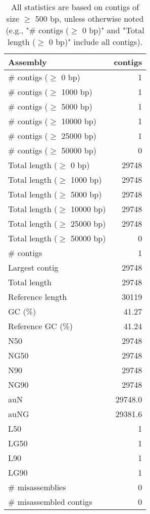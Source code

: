 \documentclass[12pt,a4paper]{article}
\begin{document}
\begin{table}[ht]
\begin{center}
\caption{All statistics are based on contigs of size $\geq$ 500 bp, unless otherwise noted (e.g., "\# contigs ($\geq$ 0 bp)" and "Total length ($\geq$ 0 bp)" include all contigs).}
\begin{tabular}{|l*{1}{|r}|}
\hline
Assembly & contigs \\ \hline
\# contigs ($\geq$ 0 bp) & 1 \\ \hline
\# contigs ($\geq$ 1000 bp) & 1 \\ \hline
\# contigs ($\geq$ 5000 bp) & 1 \\ \hline
\# contigs ($\geq$ 10000 bp) & 1 \\ \hline
\# contigs ($\geq$ 25000 bp) & 1 \\ \hline
\# contigs ($\geq$ 50000 bp) & 0 \\ \hline
Total length ($\geq$ 0 bp) & 29748 \\ \hline
Total length ($\geq$ 1000 bp) & 29748 \\ \hline
Total length ($\geq$ 5000 bp) & 29748 \\ \hline
Total length ($\geq$ 10000 bp) & 29748 \\ \hline
Total length ($\geq$ 25000 bp) & 29748 \\ \hline
Total length ($\geq$ 50000 bp) & 0 \\ \hline
\# contigs & 1 \\ \hline
Largest contig & 29748 \\ \hline
Total length & 29748 \\ \hline
Reference length & 30119 \\ \hline
GC (\%) & 41.27 \\ \hline
Reference GC (\%) & 41.24 \\ \hline
N50 & 29748 \\ \hline
NG50 & 29748 \\ \hline
N90 & 29748 \\ \hline
NG90 & 29748 \\ \hline
auN & 29748.0 \\ \hline
auNG & 29381.6 \\ \hline
L50 & 1 \\ \hline
LG50 & 1 \\ \hline
L90 & 1 \\ \hline
LG90 & 1 \\ \hline
\# misassemblies & 0 \\ \hline
\# misassembled contigs & 0 \\ \hline

\end{tabular}
\end{center}
\end{table}
\end{document}
